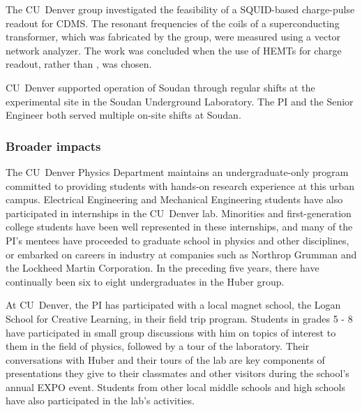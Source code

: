 The CU~Denver group investigated the feasibility of a SQUID-based charge-pulse readout for CDMS. The resonant frequencies of the coils of a superconducting transformer, which was fabricated by the group, were measured using a vector network analyzer. The work was concluded when the use of HEMTs for charge readout, rather than \SQUIDs, was chosen.

CU~Denver supported operation of \SuperCDMS Soudan through regular shifts at the experimental site in the Soudan Underground Laboratory. The PI and the Senior Engineer both served multiple on-site shifts at Soudan. 

\subsubsection{Broader impacts}
\label{priorBI}


The CU~Denver Physics Department maintains an undergraduate-only program committed to providing students with hands-on research experience at this urban campus. Electrical Engineering and Mechanical Engineering students have also participated in internships in the CU~Denver lab. Minorities and first-generation college students have been well represented in these internships, and many of the PI's mentees have proceeded to graduate school in physics and other disciplines, or embarked on careers in industry at companies such as Northrop Grumman and the Lockheed Martin Corporation. In the preceding five years, there have continually been six to eight undergraduates in the Huber group. 

At CU~Denver, the PI has participated with a local magnet school, the Logan School for Creative Learning, in their field trip program. Students in grades 5 - 8 have participated in small group discussions with him on topics of interest to them in the field of physics, followed by a tour of the laboratory. Their conversations with Huber and their tours of the lab are key components of presentations they give to their classmates and other visitors during the school's annual EXPO event. Students from other local middle schools and high schools have also participated in the lab's activities.

